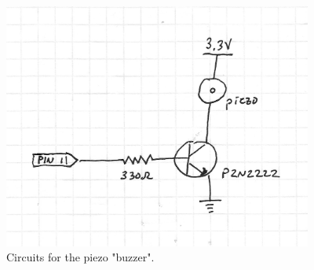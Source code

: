 \documentclass[11pt]{article} %
\begin{document}
\begin{enumerate}
\begin{figure}[htbp]
\begin{center}
\includegraphics[width=4in]{figures/piezo.png}
\caption{Circuits for the piezo "buzzer".}
\label{fig:piezo}
\end{center}
\end{figure}


\end{enumerate}
\end{document}
